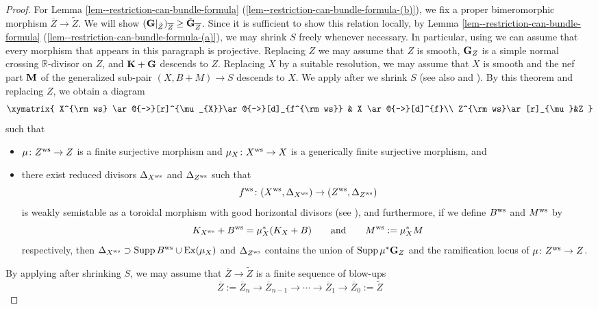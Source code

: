 \documentclass[12pt]{amsart}
\theoremstyle{definition}
\begin{document}
\begin{proof}
For Lemma \ref{lem--restriction-can-bundle-formula} (\ref{lem--restriction-can-bundle-formula-(b)}), 
we fix a proper bimeromorphic morphism $\overline{Z} \to \tilde{Z}$. 
We will show $(\boldsymbol{\rm G}|_{\tilde{Z}})_{\overline{Z}} \geq \tilde{\boldsymbol{\rm G}}_{\overline{Z}}$. 
Since it is sufficient to show this relation locally, by Lemma \ref{lem--restriction-can-bundle-formula} (\ref{lem--restriction-can-bundle-formula-(a)}), we may shrink $S$ freely whenever necessary. 
In particular,  using \cite[Corollary 2]{hironaka-flattening} we can assume that every morphism that appears in this paragraph is projective. 
Replacing $Z$ we may assume that $Z$ is smooth, $\boldsymbol{\rm G}_{Z}$ is a simple normal crossing $\mathbb{R}$-divisor on $Z$, and $\boldsymbol{\rm K}+\boldsymbol{\rm G}$ descends to $Z$. 
Replacing $X$ by a suitable resolution, we may assume that $X$ is smooth and the nef part $\boldsymbol{\rm M}$ of the generalized sub-pair $(X,B+M) \to S$ descends to $X$. 
We apply \cite[Theorem 1.17]{haconpaun} after we shrink $S$ (see also \cite[Theorem 9.5]{karu-phdthesis} and \cite[Subsection 4.5]{eh-semistablereduction}). 
By this theorem and replacing $Z$, we obtain a diagram
 $$
\xymatrix{
X^{\rm ws} \ar@{->}[r]^{\mu_{X}}\ar@{->}[d]_{f^{\rm ws}} & X \ar@{->}[d]^{f}\\
Z^{\rm ws}\ar[r]_{\mu}&Z
}
$$
such that 
\begin{itemize}
\item
$\mu \colon Z^{\rm ws} \to Z$ is a finite surjective morphism and $\mu_{X} \colon X^{\rm ws} \to X$ is a generically finite surjective morphism, and
\item
there exist reduced divisors $\Delta_{X^{\rm ws}}$ and $\Delta_{Z^{\rm ws}}$ such that 
$$f^{\rm ws}\colon (X^{\rm ws},\Delta_{X^{\rm ws}}) \to (Z^{\rm ws},\Delta_{Z^{\rm ws}})$$
is weakly semistable as a toroidal morphism with good horizontal divisors (see \cite[Definition 9.1]{karu-phdthesis}), and furthermore, if we define 
$B^{\rm ws}$ and $M^{\rm ws}$ by 
$$K_{X^{\rm ws}}+B^{\rm ws}=\mu^{*}_{X}(K_{X}+B) \qquad {\rm and} \qquad M^{\rm ws}:=\mu^{*}_{X}M$$ respectively, then  $\Delta_{X^{\rm ws}} \supset {\rm Supp}\,B^{\rm ws} \cup {\rm Ex}(\mu_{X})$ and $\Delta_{Z^{\rm ws}}$ contains the union of ${\rm Supp}\,\mu^{*}\boldsymbol{\rm G}_{Z}$ and the ramification locus of $\mu \colon Z^{\rm ws} \to Z$.   
\end{itemize}
By applying \cite[Theorem 13.2]{resolution-1} after shrinking $S$, we may assume that $\overline{Z} \to \tilde{Z}$ is a finite sequence of blow-ups
$$\overline{Z}:=\overline{Z}_{n} \to \overline{Z}_{n-1} \to \cdots \to \overline{Z}_{1} \to \overline{Z}_{0}:=\tilde{Z}$$

\end{proof}
\end{document}
